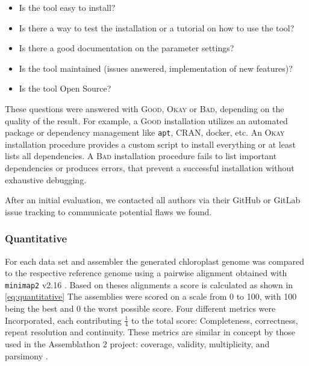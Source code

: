 \documentclass{bmcart}
\newcommand{\ok}{\textsc{Okay}}
\newcommand{\bad}{\textsc{Bad}}
\newcommand{\good}{\textsc{Good}}
\begin{document}
\begin{itemize}
    \item Is the tool easy to install? 
    \item Is there a way to test the installation or a tutorial on how to use the tool? 
    \item Is there a good documentation on the parameter settings? 
    \item Is the tool maintained (issues answered, implementation of new features)? 
    \item Is the tool Open Source?
\end{itemize}

These questions were answered with \good{}, \ok{} or \bad{}, depending on the quality of the result. 
For example, a \good{} installation utilizes an automated package or dependency management like \texttt{apt}, CRAN, docker, etc.
An \ok{} installation procedure provides a custom script to install everything or at least lists all dependencies.
A \bad{} installation procedure fails to list important dependencies or produces errors, that prevent a successful installation without exhaustive debugging.

After an initial evaluation, we contacted all authors via their GitHub or GitLab issue tracking to communicate potential flaws we found.

\subsubsection*{Quantitative}

%



For each data set and assembler the generated chloroplast genome was compared to the respective reference genome using a pairwise alignment obtained with \texttt{minimap2} v2.16 \cite{li2018minimap2}. Based on theses alignments a score is calculated as shown in \cref{eq:quantitative}
The assemblies were scored on a scale from 0 to 100, with 100 being the best and 0 the worst possible score. Four different metrics were Incorporated, each contributing  $\frac{1}{4}$ to the total score: Completeness, correctness, repeat resolution and continuity.
These metrics are similar in concept by those used in the Assemblathon 2 project: coverage, validity, multiplicity, and parsimony \cite{assemblathon2}.
\end{document}
